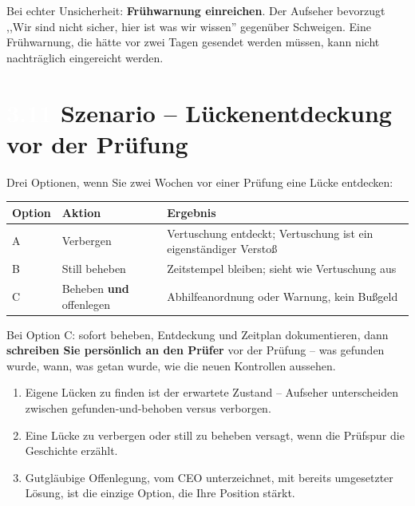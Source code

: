 \documentclass[11pt,a4paper,twoside]{book}
\newcommand{\lessontag}[1]{%
  \texorpdfstring{%
    \setlength{\fboxsep}{3pt}\colorbox{nisd2blue}{\textcolor{white}{\footnotesize\bfseries #1}}\quad%
  }{Lektion #1\ }%
}
\begin{document}
Bei echter Unsicherheit: \textbf{Frühwarnung einreichen}. Der Aufseher bevorzugt ,,Wir sind nicht sicher, hier ist was wir wissen'' gegenüber Schweigen. Eine Frühwarnung, die hätte vor zwei Tagen gesendet werden müssen, kann nicht nachträglich eingereicht werden.

\section{\lessontag{3.11}Szenario -- Lückenentdeckung vor der Prüfung}

Drei Optionen, wenn Sie zwei Wochen vor einer Prüfung eine Lücke entdecken:

\begin{center}
\begin{tabular}{@{}lll@{}}
\toprule
\textbf{Option} & \textbf{Aktion} & \textbf{Ergebnis} \\
\midrule
A & Verbergen & Vertuschung entdeckt; Vertuschung ist ein eigenständiger Verstoß \\
B & Still beheben & Zeitstempel bleiben; sieht wie Vertuschung aus \\
C & Beheben \textbf{und} offenlegen & \textcolor{successgreen}{Abhilfeanordnung oder Warnung, kein Bußgeld} \\
\bottomrule
\end{tabular}
\end{center}

Bei Option C: sofort beheben, Entdeckung und Zeitplan dokumentieren, dann \textbf{schreiben Sie persönlich an den Prüfer} vor der Prüfung -- was gefunden wurde, wann, was getan wurde, wie die neuen Kontrollen aussehen.

\begin{keytakeaways}
\begin{enumerate}
  \item Eigene Lücken zu finden ist der erwartete Zustand -- Aufseher unterscheiden zwischen gefunden-und-behoben versus verborgen.
  \item Eine Lücke zu verbergen oder still zu beheben versagt, wenn die Prüfspur die Geschichte erzählt.
  \item Gutgläubige Offenlegung, vom CEO unterzeichnet, mit bereits umgesetzter Lösung, ist die einzige Option, die Ihre Position stärkt.
\end{enumerate}
\end{keytakeaways}

\end{document}
